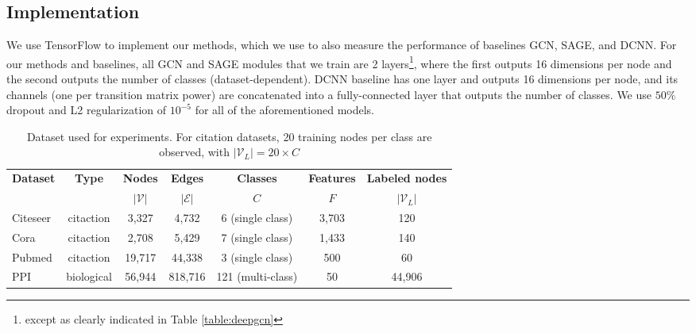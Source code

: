 \subsection{Implementation}
We use TensorFlow\citep{tensorflow} to implement our methods, which we use to also measure the performance of baselines GCN, SAGE, and DCNN.
For our methods and baselines, all GCN and SAGE modules that we train are 2 layers\footnote{except as clearly indicated in Table \ref{table:deepgcn}}, where the first outputs 16 dimensions per node and the second outputs the number of classes (dataset-dependent). DCNN baseline has one layer and outputs 16 dimensions per node, and its channels (one per transition matrix power) are concatenated into a fully-connected layer that outputs the number of classes.
We use $50\%$ dropout and L2 regularization of $10^{-5}$ for all of the aforementioned models.








\begin{table*}[t]
\begin{center}
\begin{tabular}{lcccccc}
\textbf{Dataset} 
&\textbf{Type}
& \textbf{Nodes}
&\textbf{Edges}
&\textbf{Classes}
& \textbf{Features}
& \textbf{Labeled nodes}
\\
& & $|\mathcal{V}|$ & $|\mathcal{E}|$ & $C$ & $F$ & $|\mathcal{V}_L|$
\\ \hline
Citeseer    & citaction      &3,327 &4,732 &6  (single class)&3,703 & 120 \\
Cora          & citaction   &2,708 &5,429 &7 (single class) &1,433 & 140 \\
Pubmed     & citaction         &19,717 &44,338 &3 (single class)&500 & 60 \\
PPI           & biological   & 56,944&  818,716   & 121 (multi-class) & 50 & 44,906 \\
\end{tabular}
\end{center}
\caption{Dataset used for experiments.
	For citation datasets, 20 training nodes per class are observed, with $|\mathcal{V}_L| = 20 \times C$
}
\label{table:dataset-stats}
\end{table*}


